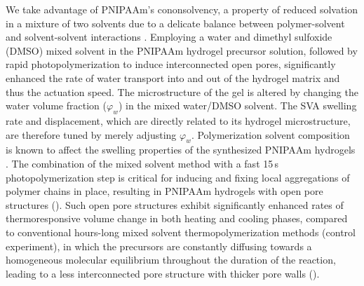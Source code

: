 
We take advantage of PNIPAAm's cononsolvency, a property of reduced solvation in a mixture of two solvents due to a delicate balance between polymer-solvent and solvent-solvent interactions \cite{Pica2016}. Employing a water and dimethyl sulfoxide (DMSO) mixed solvent in the PNIPAAm hydrogel precursor solution, followed by rapid photopolymerization to induce interconnected open pores, significantly enhanced the rate of water transport into and out of the hydrogel matrix and thus the actuation speed. The microstructure of the gel is altered by changing the water volume fraction (\(\varphi_{w}\)) in the mixed water/DMSO solvent. The SVA swelling rate and displacement, which are directly related to its hydrogel microstructure, are therefore tuned by merely  adjusting \(\varphi_{w}\). Polymerization solvent composition is known to affect the swelling properties of the synthesized PNIPAAm hydrogels . 
The combination of the mixed solvent method with a fast 15\,s photopolymerization step is critical for inducing and fixing local aggregations of polymer chains in place,
resulting in PNIPAAm hydrogels with open pore structures (). Such open pore structures exhibit significantly enhanced rates of thermoresponsive volume change in both heating and cooling phases, compared to conventional hours-long mixed solvent thermopolymerization methods (control experiment), in which the precursors are constantly diffusing towards a homogeneous molecular equilibrium throughout the duration of the reaction, leading to a less interconnected pore structure with thicker pore walls ().
